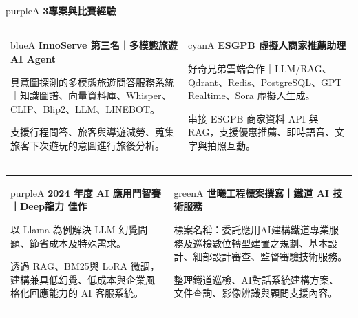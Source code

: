 \documentclass[10pt,a4paper]{extarticle}
\newcommand{\hi}[1]{\textcolor{redA}{\textbf{#1}}}
\newcommand{\sect}[3]{%
  {\fontsize{13}{14}\selectfont\bfseries\textcolor{#2}{#1}\hspace{1mm}#3}\par\vspace{.45mm}
}
\begin{document}
\vspace{1mm}
\begin{colorboxx}{purpleA}
  \sect{3}{purpleA}{專案與比賽經驗}
  \begin{tabularx}{\linewidth}{@{}X X@{}}
  \begin{colorboxx}[height=24mm]{blueA}
    {\large\bfseries InnoServe 第三名｜多模態旅遊 AI Agent}\par
    {\small 具意圖探測的多模態旅遊問答服務系統｜知識圖譜、向量資料庫、Whisper、CLIP、Blip2、LLM、LINEBOT。}\par
    {\small 支援行程問答、旅客與導遊減勞、蒐集旅客下次遊玩的意圖進行旅後分析。}
  \end{colorboxx}
  &
  \begin{colorboxx}[height=24mm]{cyanA}
    {\large\bfseries ESGPB 虛擬人商家推薦助理}\par
    {\footnotesize 好奇兄弟雲端合作｜LLM/RAG、Qdrant、Redis、PostgreSQL、GPT Realtime、Sora 虛擬人生成。}\par
    {\footnotesize 串接 ESGPB 商家資料 API 與 RAG，支援優惠推薦、即時語音、文字與拍照互動。}
  \end{colorboxx}
  \end{tabularx}
  \vspace{.8mm}
  \begin{tabularx}{\linewidth}{@{}X X@{}}
  \begin{colorboxx}[height=24mm]{purpleA}
    {\large\bfseries 2024 年度 AI 應用鬥智賽｜Deep龍力 \hi{佳作}}\par
    {\small 以 Llama 為例解決 LLM 幻覺問題、節省成本及特殊需求。}\par
    {\small 透過 RAG、BM25與 LoRA 微調，建構兼具低幻覺、低成本與企業風格化回應能力的 AI 客服系統。}
  \end{colorboxx}
  &
  \begin{colorboxx}[height=24mm]{greenA}
    {\large\bfseries 世曦工程標案撰寫｜鐵道 AI 技術服務}\par
    {\small 標案名稱：委託應用AI建構鐵道專業服務及巡檢數位轉型建置之規劃、基本設計、細部設計審查、監督審驗技術服務。}\par
    {\small 整理鐵道巡檢、AI對話系統建構方案、文件查詢、影像辨識與顧問支援內容。}
  \end{colorboxx}
  \end{tabularx}
\end{colorboxx}
\end{document}
